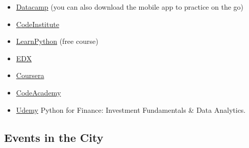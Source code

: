 \documentclass[11pt]{article}
\providecommand{\tightlist}{%
      \setlength{\itemsep}{0pt}\setlength{\parskip}{0pt}}
\begin{document}
\begin{itemize}
\tightlist
\item
  \href{https://www.datacamp.com/courses/intro-to-python-for-data-science?utm_source=adwords_ppc\&utm_campaignid=805200711\&utm_adgroupid=43370829484\&utm_device=c\&utm_keyword=\%2Bdatacamp\%20\%2Bpython\&utm_matchtype=b\&utm_network=g\&utm_adpostion=1t1\&utm_creative=191104999116\&utm_targetid=kwd-414126611260\&utm_loc_interest_ms=\&utm_loc_physical_ms=9046834\&gclid=CjwKCAjw7_rlBRBaEiwAc23rhjfi2Mw2qxQ1_zJmVEph39YX5t6HkFUTmp48oqIpZ51eN2SYDpBPahoCqGEQAvD_BwE}{Datacamp}
  (you can also download the mobile app to practice on the go)
\item
  \href{www.codeinstitute.net}{CodeInstitute}
\item
  \href{https://www.learnpython.org/}{LearnPython} (free course)
\item
  \href{https://www.edx.org/learn/python}{EDX}
\item
  \href{https://www.coursera.org/courses?query=python}{Coursera}
\item
  \href{https://www.codecademy.com/learn/learn-python}{CodeAcademy}
\item
  \href{https://www.udemy.com/python-for-finance-investment-fundamentals-data-analytics/}{Udemy}
  Python for Finance: Investment Fundamentals \& Data Analytics.
\end{itemize}

    \hypertarget{events-in-the-city}{%
\subsection{Events in the City}\label{events-in-the-city}}
\end{document}
